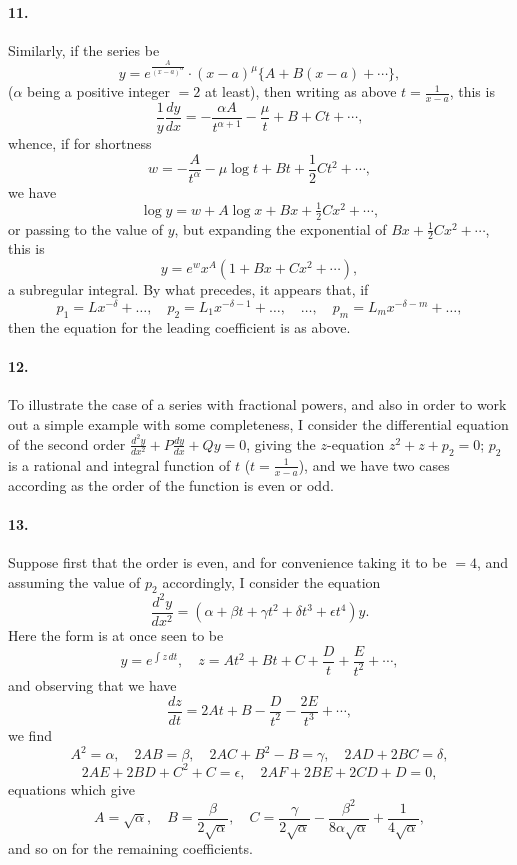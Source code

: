 \documentclass[11pt,a4paper]{book}
\begin{document}
\paragraph{11.} Similarly, if the series be
\[
y = e^{\frac{A}{(x-a)^{\alpha}}} \cdot (x-a)^{\mu}\{A + B(x-a) + \cdots\},
\]
($\alpha$ being a positive integer $= 2$ at least), then writing as above $t = \frac{1}{x-a}$, this is
\[
\frac{1}{y}\frac{dy}{dx} = -\frac{\alpha A}{t^{\alpha+1}} - \frac{\mu}{t} + B + Ct + \cdots,
\]
whence, if for shortness
\[
w = -\frac{A}{t^{\alpha}} - \mu\log t + Bt + \frac{1}{2}Ct^{2} + \cdots,
\]
we have
\[
\log y = w + A\log x + Bx + \tfrac{1}{2}Cx^{2} + \cdots,
\]
or passing to the value of $y$, but expanding the exponential of $Bx + \tfrac{1}{2}Cx^{2} + \cdots$, this is
\[
y = e^{w} x^{A} (1 + Bx + Cx^{2} + \cdots),
\]
a subregular integral. By what precedes, it appears that, if
\[
p_{1} = Lx^{-\delta} + \ldots, \quad p_{2} = L_{1}x^{-\delta-1} + \ldots, \quad \ldots, \quad p_{m} = L_{m}x^{-\delta-m} + \ldots,
\]
then the equation for the leading coefficient is as above.

\paragraph{12.} To illustrate the case of a series with fractional powers, and also in order to work out a simple example with some completeness, I consider the differential equation of the second order $\frac{d^{2}y}{dx^{2}} + P\frac{dy}{dx} + Qy = 0$, giving the $z$-equation $z^{2} + z + p_{2} = 0$; $p_{2}$ is a rational and integral function of $t$ ($t = \frac{1}{x-a}$), and we have two cases according as the order of the function is even or odd.

\paragraph{13.} Suppose first that the order is even, and for convenience taking it to be $= 4$, and assuming the value of $p_{2}$ accordingly, I consider the equation
\[
\frac{d^{2}y}{dx^{2}} = (\alpha + \beta t + \gamma t^{2} + \delta t^{3} + \epsilon t^{4})y.
\]
Here the form is at once seen to be
\[
y = e^{\int z\,dt}, \quad z = At^{2} + Bt + C + \frac{D}{t} + \frac{E}{t^{2}} + \cdots,
\]
and observing that we have
\[
\frac{dz}{dt} = 2At + B - \frac{D}{t^{2}} - \frac{2E}{t^{3}} + \cdots,
\]
we find
\[
A^{2} = \alpha, \quad 2AB = \beta, \quad 2AC + B^{2} - B = \gamma, \quad 2AD + 2BC = \delta,
\]
\[
2AE + 2BD + C^{2} + C = \epsilon, \quad 2AF + 2BE + 2CD + D = 0,
\]
equations which give
\[
A = \sqrt{\alpha}, \quad B = \frac{\beta}{2\sqrt{\alpha}}, \quad C = \frac{\gamma}{2\sqrt{\alpha}} - \frac{\beta^{2}}{8\alpha\sqrt{\alpha}} + \frac{1}{4\sqrt{\alpha}},
\]
and so on for the remaining coefficients.
\end{document}
